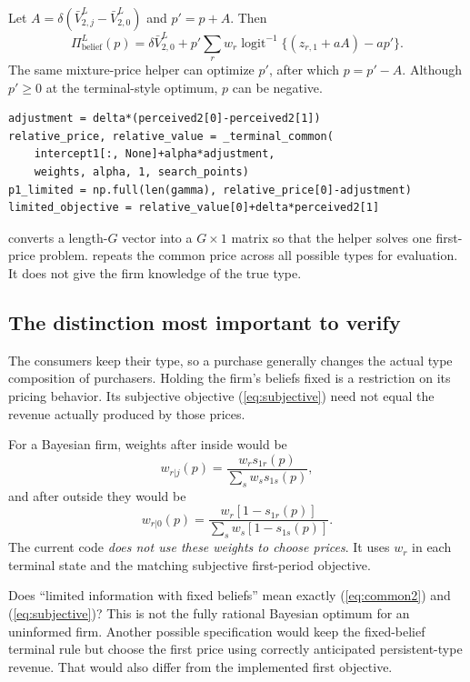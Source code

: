 \documentclass[11pt]{article}
\newcommand{\sig}{\operatorname{logit}^{-1}}
\newcommand{\code}[1]{\texttt{\detokenize{#1}}}
\newcommand{\review}[1]{\begin{tcolorbox}[colback=pale,colframe=navy,title=Decision to verify]#1\end{tcolorbox}}
\begin{document}
Let $A=\delta(\bar V^L_{2,j}-\bar V^L_{2,0})$ and $p'=p+A$. Then
\[
 \Pi^L_{\mathrm{belief}}(p)=\delta\bar V^L_{2,0}
       +p'\sum_rw_r\sig\{(z_{r,1}+aA)-ap'\}.
\]
The same mixture-price helper can optimize $p'$, after which $p=p'-A$. Although $p'\ge0$ at the terminal-style optimum, $p$ can be negative.
\begin{lstlisting}
adjustment = delta*(perceived2[0]-perceived2[1])
relative_price, relative_value = _terminal_common(
    intercept1[:, None]+alpha*adjustment,
    weights, alpha, 1, search_points)
p1_limited = np.full(len(gamma), relative_price[0]-adjustment)
limited_objective = relative_value[0]+delta*perceived2[1]
\end{lstlisting}
\code{intercept1[:, None]} converts a length-$G$ vector into a $G\times1$ matrix so that the helper solves one first-price problem. \code{np.full} repeats the common price across all possible types for evaluation. It does not give the firm knowledge of the true type.

\subsection{The distinction most important to verify}
The consumers keep their type, so a purchase generally changes the actual type composition of purchasers. Holding the firm's beliefs fixed is a restriction on its pricing behavior. Its subjective objective (\ref{eq:subjective}) need not equal the revenue actually produced by those prices.

For a Bayesian firm, weights after inside would be
\[
 w_{r|j}(p)=\frac{w_r s_{1r}(p)}{\sum_s w_s s_{1s}(p)},
\]
and after outside they would be
\[
 w_{r|0}(p)=\frac{w_r[1-s_{1r}(p)]}{\sum_s w_s[1-s_{1s}(p)]}.
\]
The current code \emph{does not use these weights to choose prices}. It uses $w_r$ in each terminal state and the matching subjective first-period objective.

\review{Does ``limited information with fixed beliefs'' mean exactly (\ref{eq:common2}) and (\ref{eq:subjective})? This is not the fully rational Bayesian optimum for an uninformed firm. Another possible specification would keep the fixed-belief terminal rule but choose the first price using correctly anticipated persistent-type revenue. That would also differ from the implemented first objective.}
\end{document}
